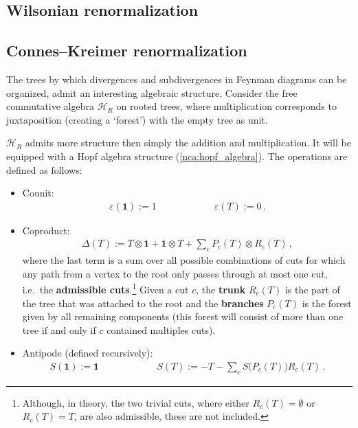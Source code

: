 \subsection{Wilsonian renormalization}


 \subsection{Connes--Kreimer renormalization}

    The trees by which divergences and subdivergences in Feynman diagrams can be organized, admit an interesting algebraic structure. Consider the free commutative algebra $\mathcal{H}_R$ on rooted trees, where multiplication corresponds to juxtaposition (creating a `forest') with the empty tree as unit.

    $\mathcal{H}_R$ admits more structure then simply the addition and multiplication. It will be equipped with a Hopf algebra structure (\cref{nca:hopf_algebra}). The operations are defined as follows:
    \begin{itemize}
        \item Counit:
        \begin{gather}
            \label{qft:connes_kreimer_counit}
            \varepsilon(\symbf{1}):=1 \qquad\qquad\qquad \varepsilon(T):=0\,.
        \end{gather}
        \item Coproduct:
        \begin{gather}
            \Delta(T) := T\otimes\symbf{1}+\symbf{1}\otimes T+\sum_cP_c(T)\otimes R_c(T)\,,
        \end{gather}
        where the last term is a sum over all possible combinations of cuts for which any path from a vertex to the root only passes through at most one cut, i.e.~the \textbf{admissible cuts}.\footnote{Although, in theory, the two trivial cuts, where either $R_c(T)=\emptyset$ or $R_c(T)=T$, are also admissible, these are not included.} Given a cut $c$, the \textbf{trunk} $R_c(T)$ is the part of the tree that was attached to the root and the \textbf{branches} $P_c(T)$ is the forest given by all remaining components (this forest will consist of more than one tree if and only if $c$ contained multiples cuts).
        \item Antipode (defined recursively):
        \begin{gather}
            \label{qft:antipode}
            S(\symbf{1}) := \symbf{1} \qquad\qquad\qquad S(T) := -T-\sum_cS\bigl(P_c(T)\bigr)R_c(T)\,.
        \end{gather}
    \end{itemize}

